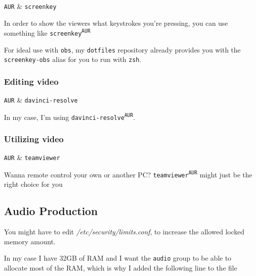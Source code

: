 \documentclass[10pt]{dustdoc}
\begin{document}
\begin{packagetable}
    \texttt{AUR} & \texttt{screenkey} \\
\end{packagetable}

In order to show the viewers what keystrokes you’re pressing, you can use something like \texttt{screenkey\textsuperscript{\texttt{AUR}}}

\begin{NOTE}
    For ideal use with \texttt{obs}, my \texttt{dotfiles} repository already provides you with the \texttt{screenkey-obs} alias for you to run with \texttt{zsh}.

\end{NOTE}

\subsubsection{Editing video}
\label{sec:editing-video}

\begin{packagetable}
    \texttt{AUR} & \texttt{davinci-resolve} \\
\end{packagetable}

In my case, I’m using \texttt{davinci-resolve\textsuperscript{\texttt{AUR}}}.

\subsubsection{Utilizing video}
\label{sec:utilizing-video}

\begin{packagetable}
    \texttt{AUR} & \texttt{teamviewer} \\
\end{packagetable}

Wanna remote control your own or another PC?
\texttt{teamviewer\textsuperscript{\texttt{AUR}}} might just be the right choice for you

\subsection{Audio Production}
\label{sec:audio-production}

You might have to edit \textit{/etc/security/limits.conf}, to increase the allowed locked memory amount.

In my case I have 32GB of RAM and I want the \texttt{audio} group to be able to allocate most of the RAM, which is why I added the following line to the file
\end{document}
